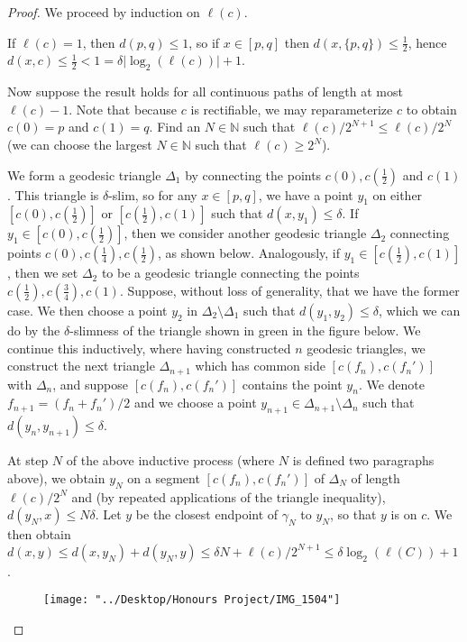 \documentclass[12pt]{article}
\newcommand{\vs}{\vskip10pt}
\begin{document}
	\begin{proof}
		
		We proceed by induction on $\ell(c)$. 
		
		\vs 
		
		If $\ell(c) = 1$, then $d(p,q) \leq 1$, so if $x \in [p,q]$ then $d(x, \{p,q\}) \leq \frac{1}{2}$, hence $d(x,c ) \leq \frac{1}{2} < 1 = \delta \vert \log_2 (\ell(c)) \vert + 1$. 
		
		\vs 
		
		Now suppose the result holds for all continuous paths of length at most $\ell(c) - 1$. Note that because $c$ is rectifiable, we may reparameterize $c$ to obtain $c(0) = p$ and $c(1) = q$. Find an $N \in \mathbb{N}$ such that $\ell(c)/2^{N+1} \leq \ell(c)/2^N$ (we can choose the largest $N \in \mathbb{N}$ such that $\ell(c) \geq 2^N$). 
		
		\vs 
		
		We form a geodesic triangle $\Delta_1$ by connecting the points $c(0), c(\frac{1}{2})$ and $c(1)$. This triangle is $\delta$-slim, so for any $x \in [p,q]$, we have a point $y_1$ on either $[c(0), c(\frac{1}{2})]$ or $[c(\frac{1}{2}), c(1)]$ such that $d(x,y_1) \leq \delta$. If $y_1 \in [c(0), c(\frac{1}{2})]$, then we consider another geodesic triangle $\Delta_2$ connecting points $c(0), c(\frac{1}{4}), c(\frac{1}{2})$, as shown below. Analogously, if $y_1 \in [c(\frac{1}{2}), c(1)]$, then we set $\Delta_2$ to be a geodesic triangle connecting the points $c(\frac{1}{2}), c(\frac{3}{4}), c(1)$. Suppose, without loss of generality, that we have the former case. We then choose a point $y_2$ in $\Delta_2 \setminus \Delta_1$ such that $d(y_1, y_2) \leq \delta$, which we can do by the $\delta$-slimness of the triangle shown in green in the figure below. We continue this inductively, where having constructed $n$ geodesic triangles, we construct the next triangle $\Delta_{n+1}$ which has common side $[c(f_n), c(f_n')]$ with $\Delta_n$, and suppose $[c(f_n), c(f_n')]$ contains the point $y_n$. We denote $f_{n+1} = (f_n + f_n')/2$ and we choose a point $y_{n+1} \in \Delta_{n+1} \setminus \Delta_n$ such that $d(y_n, y_{n+1}) \leq \delta$. 
		
		\vs 
		
		At step $N$ of the above inductive process (where $N$ is defined two paragraphs above), we obtain $y_N$ on a segment $[c(f_n), c(f_n')]$ of $\Delta_{N}$ of length $\ell(c)/2^N$ and (by repeated applications of the triangle inequality), $d(y_N, x) \leq N \delta$. Let $y$ be the closest endpoint of $\gamma_N$ to $y_N$, so that $y$ is on $c$. We then obtain $d(x,y) \leq d(x, y_N) + d(y_N, y) \leq \delta N + \ell(c)/2^{N+1} \leq \delta \log_2 (\ell(C)) +1$. 
		
\begin{figure} [h]
	\centering
	\texttt{[image: "../Desktop/Honours Project/IMG\_1504"]}
	\caption{}
	\label{fig:img1504}
\end{figure}
		 		
	\end{proof}
	
\end{document}
